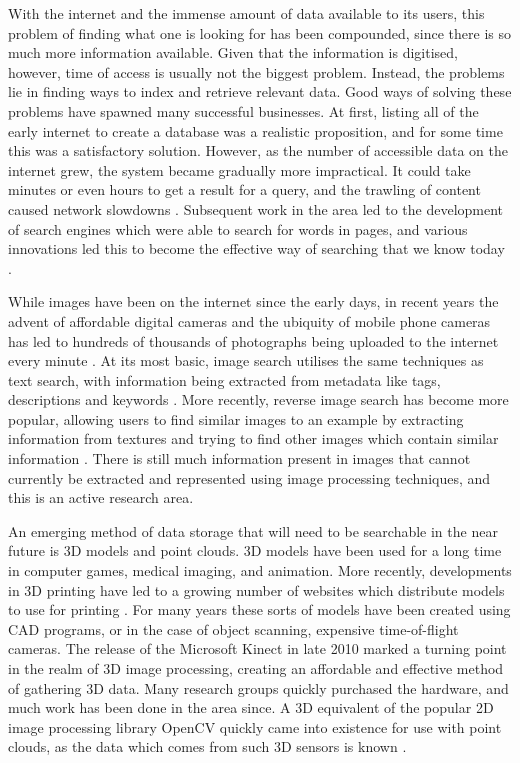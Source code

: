 \documentclass[11pt,a4paper]{kth-mag}
\begin{document}
With the internet and the immense amount of data available to its users, this
problem of finding what one is looking for has been compounded, since there is
so much more information available. Given that the information is digitised,
however, time of access is usually not the biggest problem. Instead, the
problems lie in finding ways to index and retrieve relevant data. Good ways of
solving these problems have spawned many successful businesses. At first,
listing all of the early internet to create a database was a realistic
proposition, and for some time this was a satisfactory solution. However, as the
number of accessible data on the internet grew, the system became gradually more
impractical. It could take minutes or even hours to get a result for a query,
and the trawling of content caused network slowdowns
\cite{firstsearch,archieabout,bowman1993research}. Subsequent work in the area
led to the development of search engines which were able to search for words in
pages, and various innovations led this to become the effective way of searching
that we know today \cite{brin1998anatomy,pinkerton1994finding}.

While images have been on the internet since the early days, in recent years the
advent of affordable digital cameras and the ubiquity of mobile phone cameras
has led to hundreds of thousands of photographs being uploaded to the internet
every minute \cite{fbipo,photosminute}. At its most basic, image search utilises
the same techniques as text search, with information being extracted from
metadata like tags, descriptions and keywords \cite{jing2008pagerank}. More
recently, reverse image search has become more popular, allowing users to find
similar images to an example by extracting information from textures and trying
to find other images which contain similar information \cite{lew2006content}.
There is still much information present in images that cannot currently be
extracted and represented using image processing techniques, and this is an
active research area.

An emerging method of data storage that will need to be searchable in the near
future is 3D models and point clouds. 3D models have been used for a long time
in computer games, medical imaging, and animation. More recently, developments
in 3D printing have led to a growing number of websites which distribute models
to use for printing \cite{3dprintlist}. For many years these sorts of models
have been created using CAD programs, or in the case of object scanning,
expensive time-of-flight cameras. The release of the Microsoft Kinect in late
2010 marked a turning point in the realm of 3D image processing, creating an
affordable and effective method of gathering 3D data. Many research groups
quickly purchased the hardware, and much work has been done in the area since. A
3D equivalent of the popular 2D image processing library OpenCV quickly came
into existence for use with point clouds, as the data which comes from such 3D
sensors is known \cite{opencv, pcl}.
\end{document}
